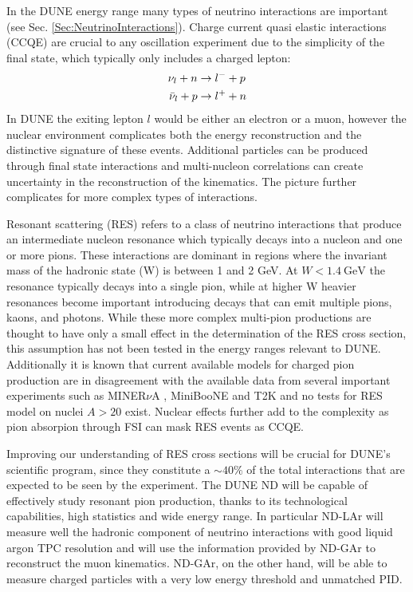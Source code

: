 In the DUNE energy range many types of neutrino interactions are important (see Sec. \ref{Sec:NeutrinoInteractions}). Charge current quasi elastic interactions (CCQE) are crucial to any oscillation experiment due to the simplicity of the final state, which typically only includes a charged lepton:
 \begin{equation}
     \begin{aligned}
    \nu_l + n &\rightarrow l^- + p\\
    \Bar{\nu}_l + p &\rightarrow l^+ + n
     \end{aligned}
 \end{equation}
In DUNE the exiting lepton $l$ would be either an electron or a muon, however the nuclear environment complicates both the energy reconstruction and the distinctive signature of these events. Additional particles can be produced through final state interactions and multi-nucleon correlations can create uncertainty in the reconstruction of the kinematics. The picture further complicates for more complex types of interactions.

Resonant scattering (RES) refers to a class of neutrino interactions that produce an intermediate nucleon resonance which typically decays into a nucleon and one or more pions. These interactions are dominant in regions where the invariant mass of the hadronic state (W) is between 1 and 2 GeV.  At $W<1.4 \ \text{GeV}$ the resonance typically decays into a single pion, while at higher W heavier resonances become important introducing decays that can emit multiple pions, kaons, and photons. While these more complex multi-pion productions are thought to have only a small effect in the determination of the RES cross section, this assumption has not been tested in the energy ranges relevant to DUNE. Additionally it is known that current available models for charged pion production are in disagreement with the available data from several important experiments such as MINER$\nu$A \cite{MINERvA:2019rhx}, MiniBooNE \cite{MiniBooNE:2010eis} and T2K \cite{T2K:2019yqu} and no tests for RES model on nuclei $A>20$ exist. Nuclear effects further add to the complexity as pion absorpion through FSI can mask RES events as CCQE.
 
Improving our understanding of RES cross sections will be crucial for DUNE's scientific program, since they constitute a $\sim 40 \%$ of the total interactions that are expected to be seen by the experiment. The DUNE ND will be capable of effectively study resonant pion production, thanks to its technological capabilities, high statistics and wide energy range. In particular ND-LAr will measure well the hadronic component of neutrino interactions with good liquid argon TPC resolution and will use the information provided by ND-GAr to reconstruct the muon kinematics. ND-GAr, on the other hand, will be able to measure charged particles with a very low energy threshold and unmatched PID.

